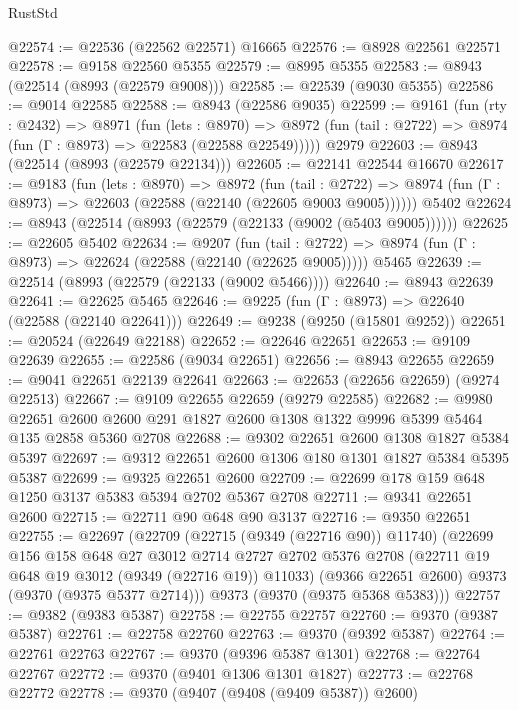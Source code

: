 \begin{lexlean}{RustStd}
\begin{coremodule}
{\begin{coremodule}
{{{{{{{{{{{{{{{{{{{{{{{{{{{{{{{{{{{{{{{@22574 := @22536 (@22562 @22571) @16665
@22576 := @8928 @22561 @22571
@22578 := @9158 @22560 @5355
@22579 := @8995 @5355
@22583 := @8943 (@22514 (@8993 (@22579 @9008)))
@22585 := @22539 (@9030 @5355)
@22586 := @9014 @22585
@22588 := @8943 (@22586 @9035)
@22599 := @9161
    (fun (rty : @2432) =>
    @8971
      (fun (lets : @8970) =>
      @8972 (fun (tail : @2722) => @8974 (fun (Γ : @8973) => @22583 (@22588 @22549)))))
    @2979
@22603 := @8943 (@22514 (@8993 (@22579 @22134)))
@22605 := @22141 @22544 @16670
@22617 := @9183
    (fun (lets : @8970) =>
    @8972
      (fun (tail : @2722) =>
      @8974 (fun (Γ : @8973) => @22603 (@22588 (@22140 (@22605 @9003 @9005))))))
    @5402
@22624 := @8943 (@22514 (@8993 (@22579 (@22133 (@9002 (@5403 @9005))))))
@22625 := @22605 @5402
@22634 := @9207
    (fun (tail : @2722) => @8974 (fun (Γ : @8973) => @22624 (@22588 (@22140 (@22625 @9005)))))
    @5465
@22639 := @22514 (@8993 (@22579 (@22133 (@9002 @5466))))
@22640 := @8943 @22639
@22641 := @22625 @5465
@22646 := @9225 (fun (Γ : @8973) => @22640 (@22588 (@22140 @22641)))
@22649 := @9238 (@9250 (@15801 @9252))
@22651 := @20524 (@22649 @22188)
@22652 := @22646 @22651
@22653 := @9109 @22639
@22655 := @22586 (@9034 @22651)
@22656 := @8943 @22655
@22659 := @9041 @22651 @22139 @22641
@22663 := @22653 (@22656 @22659) (@9274 @22513)
@22667 := @9109 @22655 @22659 (@9279 @22585)
@22682 := @9980
    @22651
    @2600
    @2600
    @291
    @1827
    @2600
    @1308
    @1322
    @9996
    @5399
    @5464
    @135
    @2858
    @5360
    @2708
@22688 := @9302 @22651 @2600 @1308 @1827 @5384 @5397
@22697 := @9312 @22651 @2600 @1306 @180 @1301 @1827 @5384 @5395 @5387
@22699 := @9325 @22651 @2600
@22709 := @22699 @178 @159 @648 @1250 @3137 @5383 @5394 @2702 @5367 @2708
@22711 := @9341 @22651 @2600
@22715 := @22711 @90 @648 @90 @3137
@22716 := @9350 @22651
@22755 := @22697
    (@22709
      (@22715 (@9349 (@22716 @90)) @11740)
      (@22699
        @156
        @158
        @648
        @27
        @3012
        @2714
        @2727
        @2702
        @5376
        @2708
        (@22711 @19 @648 @19 @3012 (@9349 (@22716 @19)) @11033)
        (@9366 @22651 @2600)
        @9373
        (@9370 (@9375 @5377 @2714)))
      @9373
      (@9370 (@9375 @5368 @5383)))
@22757 := @9382 (@9383 @5387)
@22758 := @22755 @22757
@22760 := @9370 (@9387 @5387)
@22761 := @22758 @22760
@22763 := @9370 (@9392 @5387)
@22764 := @22761 @22763
@22767 := @9370 (@9396 @5387 @1301)
@22768 := @22764 @22767
@22772 := @9370 (@9401 @1306 @1301 @1827)
@22773 := @22768 @22772
@22778 := @9370 (@9407 (@9408 (@9409 @5387)) @2600)
}}}}}}}}}}}}}}}}}}}}}}}}}}}}}}}}}}}}}}}
\end{coremodule}}
\end{coremodule}
\end{lexlean}
